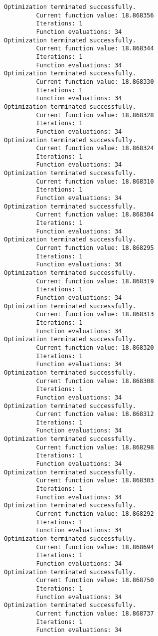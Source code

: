 \documentclass[11pt]{article}
\begin{document}
\begin{Verbatim}[commandchars=\\\{\}]
Optimization terminated successfully.
         Current function value: 18.868356
         Iterations: 1
         Function evaluations: 34
Optimization terminated successfully.
         Current function value: 18.868344
         Iterations: 1
         Function evaluations: 34
Optimization terminated successfully.
         Current function value: 18.868330
         Iterations: 1
         Function evaluations: 34
Optimization terminated successfully.
         Current function value: 18.868328
         Iterations: 1
         Function evaluations: 34
Optimization terminated successfully.
         Current function value: 18.868324
         Iterations: 1
         Function evaluations: 34
Optimization terminated successfully.
         Current function value: 18.868310
         Iterations: 1
         Function evaluations: 34
Optimization terminated successfully.
         Current function value: 18.868304
         Iterations: 1
         Function evaluations: 34
Optimization terminated successfully.
         Current function value: 18.868295
         Iterations: 1
         Function evaluations: 34
Optimization terminated successfully.
         Current function value: 18.868319
         Iterations: 1
         Function evaluations: 34
Optimization terminated successfully.
         Current function value: 18.868313
         Iterations: 1
         Function evaluations: 34
Optimization terminated successfully.
         Current function value: 18.868320
         Iterations: 1
         Function evaluations: 34
Optimization terminated successfully.
         Current function value: 18.868308
         Iterations: 1
         Function evaluations: 34
Optimization terminated successfully.
         Current function value: 18.868312
         Iterations: 1
         Function evaluations: 34
Optimization terminated successfully.
         Current function value: 18.868298
         Iterations: 1
         Function evaluations: 34
Optimization terminated successfully.
         Current function value: 18.868303
         Iterations: 1
         Function evaluations: 34
Optimization terminated successfully.
         Current function value: 18.868292
         Iterations: 1
         Function evaluations: 34
Optimization terminated successfully.
         Current function value: 18.868694
         Iterations: 1
         Function evaluations: 34
Optimization terminated successfully.
         Current function value: 18.868750
         Iterations: 1
         Function evaluations: 34
Optimization terminated successfully.
         Current function value: 18.868737
         Iterations: 1
         Function evaluations: 34

\end{Verbatim}
\end{document}
